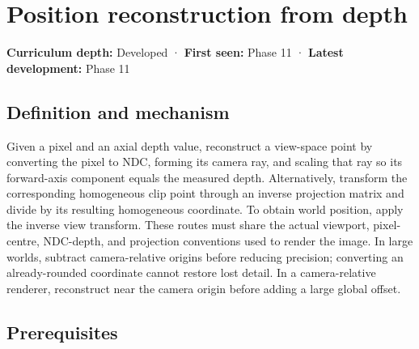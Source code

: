 \hypertarget{appendix-2cbf2968e866}{}\label{referencestart:appendix-2cbf2968e866}
\section{Position reconstruction from depth}\label{appendix-2cbf2968e866-position-reconstruction-from-depth}

\hypertarget{appendix-2cbf2968e866-position-reconstruction-from-depth}{}

\textbf{Curriculum depth:} Developed · \textbf{First seen:} Phase 11 · \textbf{Latest development:} Phase 11

\begin{allmightroledefinition}

\subsection{Definition and mechanism}\label{appendix-2cbf2968e866-definition-and-mechanism}

\hypertarget{appendix-2cbf2968e866-definition-and-mechanism}{}

Given a pixel and an axial depth value, reconstruct a view-space point by converting the pixel to NDC, forming its camera ray, and scaling that ray so its forward-axis component equals the measured depth. Alternatively, transform the corresponding homogeneous clip point through an inverse projection matrix and divide by its resulting homogeneous coordinate. To obtain world position, apply the inverse view transform. These routes must share the actual viewport, pixel-centre, NDC-depth, and projection conventions used to render the image. In large worlds, subtract camera-relative origins before reducing precision; converting an already-rounded coordinate cannot restore lost detail. In a camera-relative renderer, reconstruct near the camera origin before adding a large global offset.

\end{allmightroledefinition}

\subsection{Prerequisites}\label{appendix-2cbf2968e866-prerequisites}

\hypertarget{appendix-2cbf2968e866-prerequisites}{}

